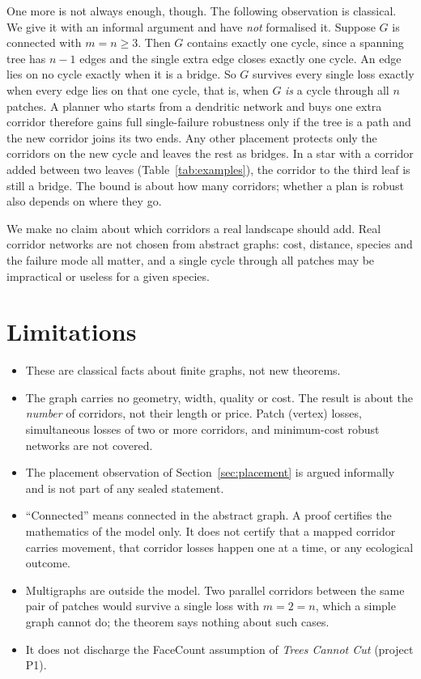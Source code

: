 \documentclass[11pt]{article}
\begin{document}
One more is not always enough, though. The following observation is classical. We give it with an informal
argument and have \emph{not} formalised it. Suppose $G$ is connected with $m=n\ge 3$. Then $G$ contains
exactly one cycle, since a spanning tree has $n-1$ edges and the single extra edge closes exactly one
cycle. An edge lies on no cycle exactly when it is a bridge. So $G$ survives every single loss exactly when
every edge lies on that one cycle, that is, when $G$ \emph{is} a cycle through all $n$ patches. A
planner who starts from a dendritic network and buys one extra corridor therefore gains full single-failure
robustness only if the tree is a path and the new corridor joins its two ends. Any other placement protects
only the corridors on the new cycle and leaves the rest as bridges. In a star with a corridor added between two
leaves (Table~\ref{tab:examples}), the corridor to the third leaf is still a bridge. The bound is about how
many corridors; whether a plan is robust also depends on where they go.

We make no claim about which corridors a real landscape should add. Real corridor networks are not chosen
from abstract graphs: cost, distance, species and the failure mode all matter, and a single cycle through all
patches may be impractical or useless for a given species.

\section{Limitations}
\begin{itemize}
\item These are classical facts about finite graphs, not new theorems.
\item The graph carries no geometry, width, quality or cost. The result is about the \emph{number} of
corridors, not their length or price. Patch (vertex) losses, simultaneous losses of two or more corridors, and
minimum-cost robust networks are not covered.
\item The placement observation of Section~\ref{sec:placement} is argued informally and is not part of any sealed
statement.
\item ``Connected'' means connected in the abstract graph. A proof certifies the mathematics of the model
only. It does not certify that a mapped corridor carries movement, that corridor losses happen one at a time, or
any ecological outcome.
\item Multigraphs are outside the model. Two parallel corridors between the same pair of patches would survive
a single loss with $m=2=n$, which a simple graph cannot do; the theorem says nothing about such cases.
\item It does not discharge the FaceCount assumption of \emph{Trees Cannot Cut} (project P1).
\end{itemize}
\end{document}
